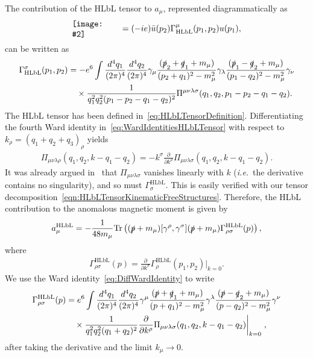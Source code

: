 \documentclass[epj]{webofc}
\newcommand{\minidiag}[2]{\begin{minipage}{2cm} \texttt{[image: \#2]} \end{minipage}}
\newcommand{\p}{\partial}
\newcommand{\<}{\langle}
\renewcommand{\>}{\rangle}
\begin{document}
The contribution of the HLbL tensor to $a_\mu$, represented
diagrammatically as
\begin{align}
	\minidiag{HLbL}{MuMuGammaHLbL} = (-ie) \bar u(p_2) \Gamma^\mu_\mathrm{HLbL}(p_1,p_2) u(p_1) ,
\end{align}
can be written as
\begin{align}
	\begin{split}
		\Gamma^\sigma_\mathrm{HLbL}(p_1,p_2) &= - e^6 \int \frac{d^4q_1}{(2\pi)^4} \frac{d^4q_2}{(2\pi)^4} \gamma_\mu \frac{(\slashed p_2 + \slashed q_1 + m_\mu)}{(p_2+q_1)^2 - m_\mu^2} \gamma_\lambda  \frac{(\slashed p_1 - \slashed q_2 + m_\mu)}{(p_1-q_2)^2 - m_\mu^2} \gamma_\nu \\
			& \quad \times \frac{1}{q_1^2 q_2^2 (p_1-p_2-q_1-q_2)^2} \Pi^{\mu\nu\lambda\sigma}(q_1,q_2,p_1-p_2-q_1-q_2) .
	\end{split}
\end{align}
The HLbL tensor has been defined
in~\eqref{eq:HLbLTensorDefinition}. Differentiating the fourth Ward
identity in~\eqref{eq:WardIdentitiesHLbLTensor} with respect to
$k_\rho=(q_1+q_2+q_3)_\rho$ yields 
\begin{align}
	\label{eq:DiffWardIdentity}
	\Pi_{\mu\nu\lambda\rho}(q_1,q_2,k-q_1-q_2) = - k^\sigma \frac{\p}{\p k^\rho} \Pi_{\mu\nu\lambda\sigma}(q_1,q_2,k-q_1-q_2) .
\end{align}
It was already argued in~\cite{Aldins:1970id} that $\Pi_{\mu\nu\lambda\sigma}$
vanishes linearly with $k$ ({\em i.e.}\ the derivative contains no singularity),
and so must $\Gamma_\sigma^\mathrm{HLbL}$. This is easily verified with our
tensor
decomposition~\eqref{eqn:HLbLTensorKinematicFreeStructures}. Therefore, the
HLbL contribution to the anomalous magnetic moment is given by 
\begin{align}
	\label{eq:amuTraceFormula}
	a_\mu^\mathrm{HLbL} = - \frac{1}{48 m_\mu} \mathrm{Tr}\left( (\slashed p + m_\mu) [\gamma^\rho,\gamma^\sigma] (\slashed p + m_\mu) \Gamma_{\rho\sigma}^\mathrm{HLbL}(p) \right) ,
\end{align}
where
\begin{align}
	\Gamma^\mathrm{HLbL}_{\rho\sigma}(p) = \frac{\p}{\p k^\sigma} \Gamma^\mathrm{HLbL}_\rho(p_1,p_2) \bigg|_{k=0} .
\end{align}
We use the Ward identity~\eqref{eq:DiffWardIdentity} to write
\begin{align}
	\begin{split}
		\label{eq:GammaHLbLTwoLoop}
		\Gamma_{\rho\sigma}^\mathrm{HLbL}(p) &= e^6 \int \frac{d^4q_1}{(2\pi)^4} \frac{d^4q_2}{(2\pi)^4} \gamma^\mu \frac{(\slashed p + \slashed q_1 + m_\mu)}{(p+q_1)^2 - m_\mu^2} \gamma^\lambda  \frac{(\slashed p - \slashed q_2 + m_\mu)}{(p-q_2)^2 - m_\mu^2} \gamma^\nu \\
			& \quad \times \frac{1}{q_1^2 q_2^2 (q_1+q_2)^2}
                \frac{\p}{\p k^\rho}
                \Pi_{\mu\nu\lambda\sigma}(q_1,q_2,k-q_1-q_2) \bigg|_{k=0}
                \; ,
	\end{split}
\end{align}
after taking the derivative and the limit $k_\mu \to 0$.
\end{document}
